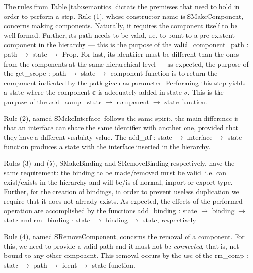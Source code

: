 	
  \noindent The rules from Table \ref{tab:semantics} dictate the premisses that need to hold
  in order to perform a step. Rule (1), whose constructor name is \textsf{SMakeComponent},
  concerns making \textsf{component}s. Naturally, it requires the \textsf{component} itself to be well-formed.
  Further, its \textsf{path} needs to be valid, i.e. to point to a pre-existent \textsf{component} in the hierarchy ---
  this is the purpose of the \textsf{valid\_component\_path : path $\rightarrow$ state $\rightarrow$ Prop}.
  For last, its \textsf{identifier} must be different than
  the ones from the \textsf{component}s at the same hierarchical level --- as expected, the purpose 
  of the \textsf{get\_scope : path $\rightarrow$ state $\rightarrow$ component} function is to
  return the \textsf{component} indicated by the \textsf{path} given as parameter. Performing this step
  yields a state where the \textsf{component} \textbf{c} is adequately added in state $\sigma$. This
  is the purpose of the \textsf{add\_comp : state $\rightarrow$ component $\rightarrow$ state} function.
    
  
  Rule (2), named \textsf{SMakeInterface}, follows the same spirit, the main difference is that
  an \textsf{interface} can share the same \textsf{identifier} with another one, provided that
  they have a different \textsf{visibility} value. The \textsf{add\_itf :  state $\rightarrow$ interface $\rightarrow$ state} 
  function produces a \textsf{state} with the \textsf{interface} inserted in the hierarchy.  
  

 Rules (3) and (5), \textsf{SMakeBinding} and \textsf{SRemoveBinding} respectively, 
 have the same requirement: the \textsf{binding}
 to be made/removed must be valid, i.e. can exist/exists in the hierarchy and will be/is
 of \textsf{normal}, \textsf{import} or \textsf{export} type. Further, for the creation of \textsf{binding}s, 
 in order to prevent useless duplication we require that it does not already exists. 
 As expected, the effects of the performed \textsf{operation} are accomplished by the
 functions \textsf{add\_binding : state $\rightarrow$ binding $\rightarrow$ state} 
 and \textsf{rm\_binding : state $\rightarrow$ binding $\rightarrow$ state}, respectively.
 
 Rule (4), named \textsf{SRemoveComponent}, concerns the removal of a \textsf{component}. For this, we need to 
 provide a valid \textsf{path} and it must not be \textit{connected}, that is, not bound to any other 
 \textsf{component}. This removal occurs by the use of the 
 \textsf{rm\_comp : state $\rightarrow$ path $\rightarrow$ ident $\rightarrow$ state} function.


